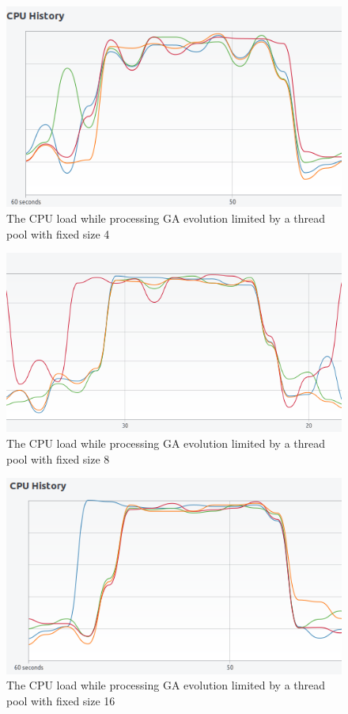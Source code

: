 \begin{figure}[h]
\centering\includegraphics[width=.8\textwidth]{img/exp/2/limit-threadpool-4}
\caption{The CPU load while processing GA evolution limited by a thread pool with fixed size 4 }  \label{img:cpu-thread-4}
\end{figure}
\smallskip

\begin{figure}[h]
\centering\includegraphics[width=.8\textwidth]{img/exp/2/limit-threadpool-8}
\caption{The CPU load while processing GA evolution limited by a thread pool with fixed size 8 }  \label{img:cpu-thread-8}
\end{figure}
\smallskip

\begin{figure}[h]
\centering\includegraphics[width=.8\textwidth]{img/exp/2/limit-threadpool-16}
\caption{The CPU load while processing GA evolution limited by a thread pool with fixed size 16 }  \label{img:cpu-thread-16}
\end{figure}
\smallskip

